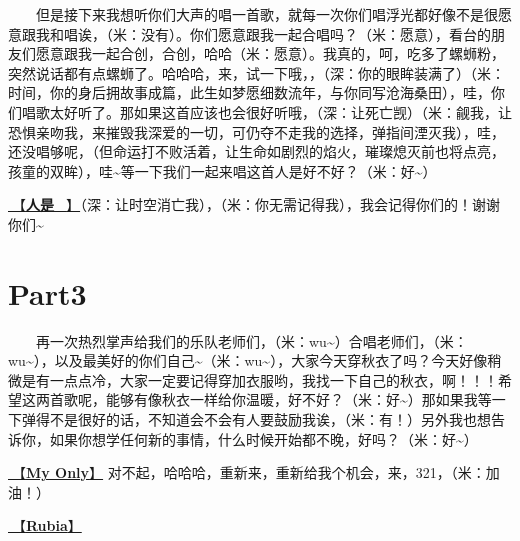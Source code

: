\documentclass[]{ctexbook}
\begin{document}
  但是接下来我想听你们大声的唱一首歌，就每一次你们唱浮光都好像不是很愿意跟我和唱诶，（米：没有）。你们愿意跟我一起合唱吗？（米：愿意），看台的朋友们愿意跟我一起合创，合创，哈哈（米：愿意）。我真的，呵，吃多了螺蛳粉，突然说话都有点螺蛳了。哈哈哈，来，试一下哦，，（深：你的眼眸装满了）（米：时间，你的身后拥故事成篇，此生如梦愿细数流年，与你同写沧海桑田），哇，你们唱歌太好听了。那如果这首应该也会很好听哦，（深：让死亡觊）（米：觎我，让恐惧亲吻我，来摧毁我深爱的一切，可仍夺不走我的选择，弹指间湮灭我），哇，还没唱够呢，（但命运打不败活着，让生命如剧烈的焰火，璀璨熄灭前也将点亮，孩童的双眸），哇\textasciitilde 等一下我们一起来唱这首人是好不好？（米：好\textasciitilde）

\hyperref[renshi]{🎵【\textbf{人是\_}】}（深：让时空消亡我），（米：你无需记得我），我会记得你们的！谢谢你们\textasciitilde{}

\section{Part3}\label{nanning-20241207-part3}

  再一次热烈掌声给我们的乐队老师们，（米：wu\textasciitilde）合唱老师们，（米：wu\textasciitilde），以及最美好的你们自己\textasciitilde（米：wu\textasciitilde），大家今天穿秋衣了吗？今天好像稍微是有一点点冷，大家一定要记得穿加衣服哟，我找一下自己的秋衣，啊！！！希望这两首歌呢，能够有像秋衣一样给你温暖，好不好？（米：好\textasciitilde）那如果我等一下弹得不是很好的话，不知道会不会有人要鼓励我诶，（米：有！）另外我也想告诉你，如果你想学任何新的事情，什么时候开始都不晚，好吗？（米：好\textasciitilde）

\hyperref[my-only]{🎵【\textbf{My Only}】} 对不起，哈哈哈，重新来，重新给我个机会，来，321，（米：加油！）

\hyperref[rubia]{🎵【\textbf{Rubia}】}
\end{document}
